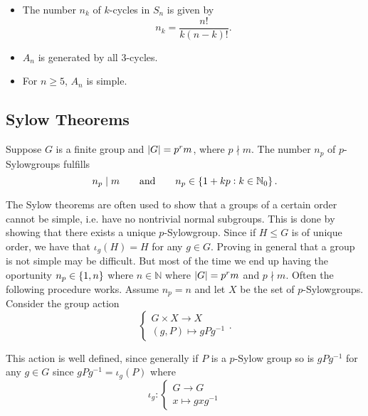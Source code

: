 \begin{itemize}
	\item The number $n_k$ of $k$-cycles in $S_n$ is given by 
		\begin{equation}
			n_k = \frac{n!}{k(n - k)!}.
		\end{equation}

	\item $A_n$ is generated by all $3$-cycles.
	\item For $n \geq 5$, $A_n$ is simple.
\end{itemize}

\subsection{Sylow Theorems}

Suppose $G$ is a finite group and $\abs[0]{G} = p^r m$, where $p \nmid m$. The number $n_p$ of $p$-Sylowgroups fulfills 
\begin{equation}
	n_p \mid m \qquad \text{and} \qquad n_p \in \cbr[0]{1 + kp : k \in \mathbb{N}_0}.
\end{equation}

The Sylow theorems are often used to show that a groups of a certain order cannot be simple, i.e. have no nontrivial normal subgroups. This is done by showing that there exists a unique $p$-Sylowgroup. Since if $H \leq G$ is of unique order, we have that $\iota_g(H) = H$ for any $g \in G$. Proving in general that a group is not simple may be difficult. But most of the time we end up having the oportunity $n_p \in \cbr[0]{1,n}$ where $n \in \mathbb{N}$ where $\abs[0]{G} = p^rm$ and $p \nmid m$. Often the following procedure works. Assume $n_p = n$ and let $X$ be the set of $p$-Sylowgroups. Consider the group action
	\begin{equation}
		\begin{cases}
			G \times X \to X\\
			(g,P) \mapsto gPg^{-1}
		\end{cases}.
	\end{equation}

	This action is well defined, since generally if $P$ is a $p$-Sylow group so is $gPg^{-1}$ for any $g \in G$ since $gPg^{-1} = \iota_g(P)$ where 
	\begin{equation}
		\iota_g:\begin{cases}
			G \to G\\
			x \mapsto gxg^{-1}
		\end{cases}
	\end{equation}
	
